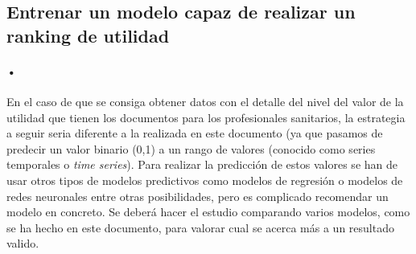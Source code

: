 \subsection{Entrenar un modelo capaz de realizar un ranking de utilidad}
\paragraph{•} En el caso de que se consiga obtener datos con el detalle del nivel del valor de la utilidad que tienen los documentos para los profesionales sanitarios, la estrategia a seguir seria diferente a la realizada en este documento (ya que pasamos de predecir un valor binario (0,1) a un rango de valores (conocido como series temporales o \textit{time series}). Para realizar la predicción de estos valores se han de usar otros tipos de modelos predictivos como modelos de regresión o modelos de redes neuronales entre otras posibilidades, pero es complicado recomendar un modelo en concreto. Se deberá hacer el estudio comparando varios modelos, como se ha hecho en este documento, para valorar cual se acerca más a un resultado valido.